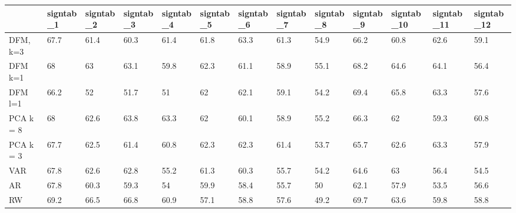 \begin{tabular}{lllllllllllll}
\toprule 
& signtab_1 & signtab_2 & signtab_3 & signtab_4 & signtab_5 & signtab_6 & signtab_7 & signtab_8 & signtab_9 & signtab_10 & signtab_11 & signtab_12 \\ 
\midrule 
DFM, k=3 & 67.7 & 61.4 & 60.3 & 61.4 & 61.8 & 63.3 & 61.3 & 54.9 & 66.2 & 60.8 & 62.6 & 59.1 \\ 
DFM k=1 & 68 & 63 & 63.1 & 59.8 & 62.3 & 61.1 & 58.9 & 55.1 & 68.2 & 64.6 & 64.1 & 56.4 \\ 
DFM  l=1 & 66.2 & 52 & 51.7 & 51 & 62 & 62.1 & 59.1 & 54.2 & 69.4 & 65.8 & 63.3 & 57.6 \\ 
PCA k = 8 & 68 & 62.6 & 63.8 & 63.3 & 62 & 60.1 & 58.9 & 55.2 & 66.3 & 62 & 59.3 & 60.8 \\ 
PCA k = 3 & 67.7 & 62.5 & 61.4 & 60.8 & 62.3 & 62.3 & 61.4 & 53.7 & 65.7 & 62.6 & 63.3 & 57.9 \\ 
VAR & 67.8 & 62.6 & 62.8 & 55.2 & 61.3 & 60.3 & 55.7 & 54.2 & 64.6 & 63 & 56.4 & 54.5 \\ 
AR & 67.8 & 60.3 & 59.3 & 54 & 59.9 & 58.4 & 55.7 & 50 & 62.1 & 57.9 & 53.5 & 56.6 \\ 
RW & 69.2 & 66.5 & 66.8 & 60.9 & 57.1 & 58.8 & 57.6 & 49.2 & 69.7 & 63.6 & 59.8 & 58.8 \\ 
\bottomrule 
\end{tabular}